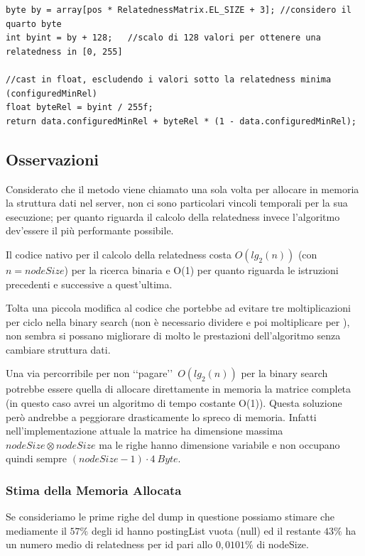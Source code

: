 \begin{lstlisting}[style=JavaStyle, caption=Conversione della relatedness da byte a float]
byte by = array[pos * RelatednessMatrix.EL_SIZE + 3]; //considero il quarto byte 
int byint = by + 128;   //scalo di 128 valori per ottenere una relatedness in [0, 255]

//cast in float, escludendo i valori sotto la relatedness minima (configuredMinRel)
float byteRel = byint / 255f; 
return data.configuredMinRel + byteRel * (1 - data.configuredMinRel);
\end{lstlisting}

\subsection{Osservazioni}
Considerato che il metodo  viene chiamato una sola volta per allocare in memoria la struttura dati nel server, 
non ci sono particolari vincoli temporali per la sua esecuzione; per quanto riguarda il calcolo della relatedness invece 
l'algoritmo dev'essere il più performante possibile.

Il codice nativo per il calcolo della relatedness costa $O(lg_2(n))$ (con $n=nodeSize$) per la ricerca binaria e O(1) per quanto riguarda le 
istruzioni precedenti e successive a quest'ultima.

Tolta una piccola modifica al codice che portebbe ad evitare tre moltiplicazioni per ciclo nella binary search (non è necessario dividere e poi moltiplicare per 
), non sembra si possano migliorare di molto le prestazioni dell'algoritmo senza cambiare struttura dati.

Una via percorribile per non \lq\lq pagare\rq\rq\ $O(lg_2(n))$ per la binary search potrebbe essere quella di allocare direttamente in memoria la matrice 
completa (in questo caso avrei un algoritmo di tempo costante O(1)). Questa soluzione però andrebbe a peggiorare drasticamente lo spreco di memoria.
Infatti nell'implementazione attuale la matrice ha dimensione massima $nodeSize \otimes nodeSize$ ma le righe hanno dimensione variabile e 
non occupano quindi sempre $(nodeSize -1) \cdot 4\ Byte$.

\subsubsection{Stima della Memoria Allocata}
Se consideriamo le prime righe del dump in questione possiamo stimare che mediamente il $57\%$ degli id hanno postingList vuota (null) ed il restante $43\%$ ha un numero 
medio di relatedness per id pari allo $0,0101\%$ di nodeSize.

